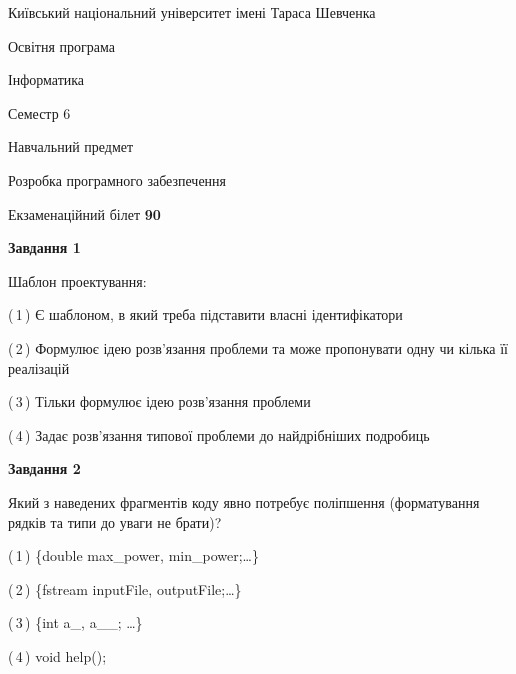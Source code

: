\documentclass[10pt, ukrainian]{article}
\begin{document}
{{\begin {small}\par
{ \center  Київський національний університет імені Тараса Шевченка \par}
{\parbox {5 cm}{Освітня програма \hfill}{\parbox {7 cm}{Інформатика \hfill}}\parbox {6 cm}{\hfill Семестр 6}}\par
{\parbox {5 cm} {Навчальний предмет \hfill}\parbox {7 cm}{Розробка програмного забезпечення \hfill}\parbox {6cm}{\hfill}\par}\vspace{-7pt} \end{small}}{\center Екзаменаційний білет \No \textbf
{ 90 }\par}}
{
\begin {large}
{\begin {center}\textbf{Завдання 1}\end {center}}\par
Шаблон проектування:\par
\vspace{2mm}



(\,1\,) Є шаблоном, в який треба підставити власні ідентифікатори%



(\,2\,) Формулює ідею розв'язання проблеми та може пропонувати одну чи кілька її реалізацій%



(\,3\,) Тільки формулює ідею розв'язання проблеми%



(\,4\,) Задає розв'язання типової проблеми до найдрібніших подробиць%


{\begin {center}\textbf{Завдання 2}\end {center}}\par
Який з наведених фрагментів коду явно потребує поліпшення (форматування рядків та типи до уваги не брати)?\par
\vspace{2mm}



(\,1\,) \{double max\_power, min\_power;…\} %



(\,2\,) \{fstream inputFile, outputFile;…\} %



(\,3\,) \{int a\_, a\_\_; …\}%



(\,4\,) void help();%



\end{large}}
\end{document}
